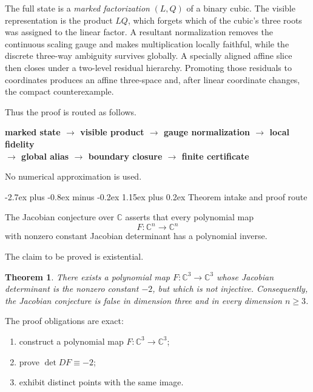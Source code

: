 \documentclass[11pt,letterpaper]{article}
\makeatletter
\newcommand{\C}{\mathbb{C}}
\theoremstyle{jgpplain}
\newtheorem{theorem}{Theorem}
\renewcommand{\section}{\@startsection{section}{1}{0pt}%
  {-2.7ex plus -0.8ex minus -0.2ex}%
  {1.15ex plus 0.2ex}%
  {\normalfont\sffamily\Large\bfseries\color{JGPBlue}}}
\makeatother
\begin{document}
The full state is a \emph{marked factorization} \((L,Q)\) of a binary cubic.
The visible representation is the product \(LQ\), which forgets which of the
cubic's three roots was assigned to the linear factor. A resultant
normalization removes the continuous scaling gauge and makes multiplication
locally faithful, while the discrete three-way ambiguity survives globally. A
specially aligned affine slice then closes under a two-level residual
hierarchy. Promoting those residuals to coordinates produces an affine
three-space and, after linear coordinate changes, the compact counterexample.

Thus the proof is routed as follows.

\begin{routebox}
\centering\sffamily\bfseries\color{JGPDarkBlue}
marked state \(\longrightarrow\) visible product
\(\longrightarrow\) gauge normalization
\(\longrightarrow\) local fidelity\\[2pt]
\(\longrightarrow\) global alias
\(\longrightarrow\) boundary closure
\(\longrightarrow\) finite certificate
\end{routebox}

No numerical approximation is used.

\section{Theorem intake and proof route}

The Jacobian conjecture over \(\C\) asserts that every polynomial map
\[
F:\C^n\longrightarrow\C^n
\]
with nonzero constant Jacobian determinant has a polynomial inverse.

The claim to be proved is existential.

\begin{theorem}\label{thm:counterexample}
There exists a polynomial map \(F:\C^3\to\C^3\) whose Jacobian determinant is
the nonzero constant \(-2\), but which is not injective. Consequently, the
Jacobian conjecture is false in dimension three and in every dimension
\(n\geq 3\).
\end{theorem}

The proof obligations are exact:
\begin{enumerate}
  \item construct a polynomial map \(F:\C^3\to\C^3\);
  \item prove \(\det DF\equiv -2\);
  \item exhibit distinct points with the same image.
\end{enumerate}
\end{document}
